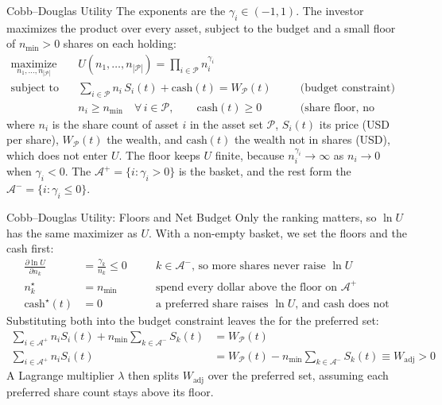 \documentclass[aspectratio=169,11pt]{beamer}
\newcommand{\Ap}{\mathcal{A}^{+}}
\newcommand{\Am}{\mathcal{A}^{-}}
\newcommand{\WP}{W_{\mathcal{P}}}
\newcommand{\Wadj}{W_{\mathrm{adj}}}
\newcommand{\np}{|\mathcal{P}|}
\begin{document}
\begin{frame}{Cobb–Douglas Utility}
  The exponents are the  $\gamma_i\in(-1,1)$. The
  investor maximizes the product over every asset, subject to the budget and a
  small floor of $n_{\min}>0$ shares on each holding:
  \[
    \boxed{\begin{aligned}
      \operatorname*{maximize}_{n_1,\ldots,n_{\np}}\quad&U(n_1,\ldots,n_{\np})=\prod_{i\in\mathcal{P}}n_i^{\gamma_i}\\
      \text{subject to}\quad&\sum_{i\in\mathcal{P}}n_i\,S_i(t)+\text{cash}(t)=\WP(t)&&\quad\text{(budget constraint)}\\
      &n_i\ge n_{\min}\quad\forall\,i\in\mathcal{P},\qquad\text{cash}(t)\ge0&&\quad\text{(share floor, no borrowing)}
    \end{aligned}}
  \]
  where $n_i$ is the share count of asset $i$ in the asset set $\mathcal{P}$,
  $S_i(t)$ its price (USD per share), $\WP(t)$ the wealth, and $\text{cash}(t)$
  the wealth not in shares (USD), which does not enter $U$. The floor
  keeps $U$ finite, because $n_i^{\gamma_i}\to\infty$ as $n_i\to0$ when
  $\gamma_i<0$. The  $\Ap=\{i:\gamma_i>0\}$ is the basket,
  and the rest form the  $\Am=\{i:\gamma_i\le0\}$.
\end{frame}

\begin{frame}{Cobb–Douglas Utility: Floors and Net Budget}
  \setlength{\jot}{1pt}
  Only the ranking matters, so $\ln U$ has the same maximizer as $U$. With a
  non-empty basket, we set the floors and the cash first:
  \[
    \begin{aligned}
      \frac{\partial\ln U}{\partial n_k}&=\frac{\gamma_k}{n_k}\le0
        &&\quad k\in\Am\text{, so more shares never raise }\ln U\\
      n_k^\star&=n_{\min}
        &&\quad\text{spend every dollar above the floor on }\Ap\\
      \text{cash}^\star(t)&=0
        &&\quad\text{a preferred share raises }\ln U\text{, and cash does not}
    \end{aligned}
  \]
  Substituting both into the budget constraint leaves the
   for the preferred set:
  \[
    \begin{aligned}
      \sum_{i\in\Ap}n_iS_i(t)+n_{\min}\sum_{k\in\Am}S_k(t)&=\WP(t)\\
      \sum_{i\in\Ap}n_iS_i(t)&=\WP(t)-n_{\min}\sum_{k\in\Am}S_k(t)\equiv\Wadj>0
    \end{aligned}
  \]
  A Lagrange multiplier $\lambda$ then splits $\Wadj$ over the preferred set,
  assuming each preferred share count stays above its floor.
\end{frame}
\end{document}

